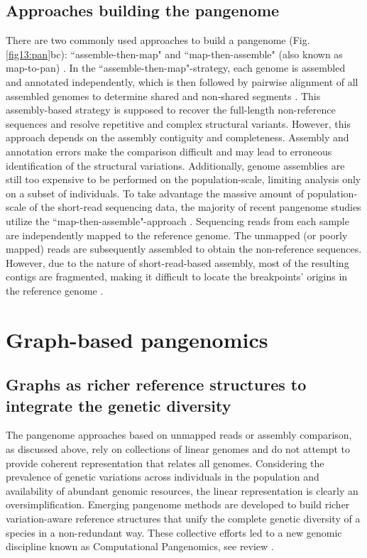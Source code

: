 \documentclass[../main.tex]{subfiles}
\begin{document}
\subsection{Approaches building the pangenome}

There are two commonly used approaches to build a pangenome (Fig. \ref{fig13:pan}bc): “assemble-then-map" and “map-then-assemble" (also known as map-to-pan) \citep{golicz2020pangenomics}. In the “assemble-then-map"-strategy, each genome is assembled and annotated independently, which is then followed by pairwise alignment of all assembled genomes to determine shared and non-shared segments \citep{duan2019hupan,li2019towards,eisfeldt2020discovery}. This assembly-based strategy is supposed to recover the full-length non-reference sequences and resolve repetitive and complex structural variants. However, this approach depends on the assembly contiguity and completeness. Assembly and annotation errors make the comparison difficult and may lead to erroneous identification of the structural variations. Additionally, genome assemblies are still too expensive to be performed on the population-scale, limiting analysis only on a subset of individuals. To take advantage the massive amount of population-scale of the short-read sequencing data, the majority of  recent pangenome studies utilize the “map-then-assemble"-approach \citep{holden2018assembly,laine2019exploring,sherman2019assembly}. Sequencing reads from each sample are independently mapped to the reference genome. The  unmapped (or poorly mapped) reads are subsequently assembled to obtain the non-reference sequences. However, due to the nature of short-read-based assembly, most of the resulting contigs are fragmented, making it difficult to locate the breakpoints’ origins in the reference genome \citep{sherman2019assembly}. 

\section{Graph-based pangenomics}

\subsection{Graphs as richer reference structures to integrate the genetic diversity}

The pangenome approaches based on unmapped reads or assembly comparison, as discussed above, rely on collections of linear genomes and do not attempt to provide coherent representation that relates all genomes. Considering the prevalence of genetic variations across individuals in the population and availability of abundant genomic resources, the linear representation is clearly an oversimplification. Emerging pangenome methods are developed to build richer variation-aware reference structures that unify the complete genetic diversity of a species in a non-redundant way. These collective efforts led to a new genomic discipline known as Computational Pangenomics, see review \citep{paten2017genome,computational2018computational,eizenga2020pangenome}.
\end{document}
